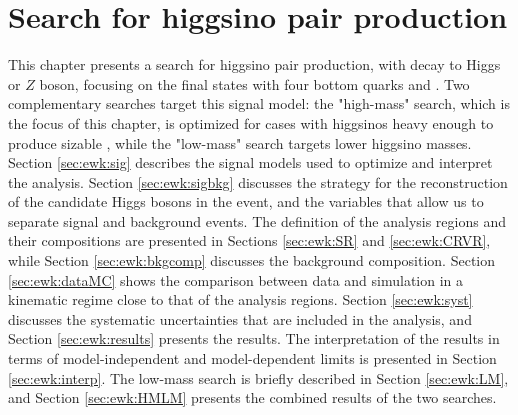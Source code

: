 \chapter{Search for higgsino pair production}
\label{chap:ewk_prod}

This chapter presents a search for higgsino pair production, with decay to Higgs or $Z$ boson, 
focusing on the final states with four bottom quarks and \met. 
Two complementary searches target this signal model: the "high-mass" search,
which is the focus of this chapter, is optimized for 
cases with higgsinos heavy enough to produce sizable \met, while the "low-mass" search 
targets lower higgsino masses.
Section \ref{sec:ewk:sig} describes the signal models used to optimize and interpret the analysis. 
Section \ref{sec:ewk:sigbkg} discusses the strategy for the reconstruction of the candidate Higgs bosons in the event, 
and the variables that allow us to separate signal and background events. 
The definition of the analysis regions and their compositions are presented in Sections \ref{sec:ewk:SR} and 
\ref{sec:ewk:CRVR}, 
while Section \ref{sec:ewk:bkgcomp} discusses the background composition. 
Section \ref{sec:ewk:dataMC} shows the comparison between data and simulation in a kinematic regime close to that of the analysis regions. 
Section \ref{sec:ewk:syst} discusses the systematic uncertainties that are included in the analysis, and Section \ref{sec:ewk:results} 
presents the results. 
The interpretation of the results in terms of model-independent and model-dependent limits is presented in Section \ref{sec:ewk:interp}. 
The low-mass search is briefly described in Section \ref{sec:ewk:LM}, and Section \ref{sec:ewk:HMLM}  
presents the combined results of the two searches. 








